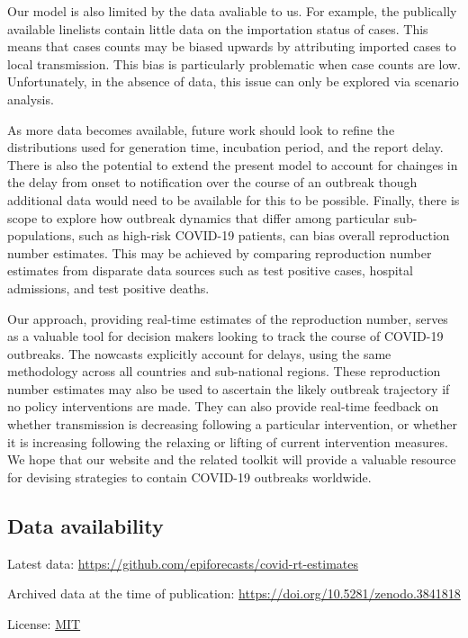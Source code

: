 \documentclass[
]{article}
\begin{document}
Our model is also limited by the data avaliable to us. For example, the
publically available linelists contain little data on the importation
status of cases. This means that cases counts may be biased upwards by
attributing imported cases to local transmission. This bias is
particularly problematic when case counts are low. Unfortunately, in the
absence of data, this issue can only be explored via scenario analysis.

As more data becomes available, future work should look to refine the
distributions used for generation time, incubation period, and the
report delay. There is also the potential to extend the present model to
account for chainges in the delay from onset to notification over the
course of an outbreak though additional data would need to be available
for this to be possible. Finally, there is scope to explore how outbreak
dynamics that differ among particular sub-populations, such as high-risk
COVID-19 patients, can bias overall reproduction number estimates. This
may be achieved by comparing reproduction number estimates from
disparate data sources such as test positive cases, hospital admissions,
and test positive deaths.

Our approach, providing real-time estimates of the reproduction number,
serves as a valuable tool for decision makers looking to track the
course of COVID-19 outbreaks. The nowcasts explicitly account for
delays, using the same methodology across all countries and sub-national
regions. These reproduction number estimates may also be used to
ascertain the likely outbreak trajectory if no policy interventions are
made. They can also provide real-time feedback on whether transmission
is decreasing following a particular intervention, or whether it is
increasing following the relaxing or lifting of current intervention
measures. We hope that our website and the related toolkit will provide
a valuable resource for devising strategies to contain COVID-19
outbreaks worldwide.

\hypertarget{data-availability}{%
\subsection{Data availability}\label{data-availability}}

Latest data: \url{https://github.com/epiforecasts/covid-rt-estimates}

Archived data at the time of publication:
\url{https://doi.org/10.5281/zenodo.3841818}

License: \href{https://opensource.org/licenses/MIT}{MIT}
\end{document}
